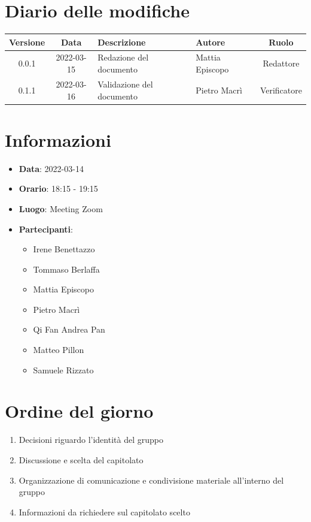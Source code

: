 \documentclass[12pt, a4paper,table]{article}
\begin{document}
	\section*{Diario delle modifiche}
	\begin{center}
	\begin{tabular}{ |c|c|m{9em}|m{5em}|c| }
	\hline
	\textbf{Versione} & \textbf{Data} & \textbf{Descrizione} &  \textbf{Autore} &  \textbf{Ruolo} \\
	\hline
	0.0.1 & 2022-03-15 & Redazione del documento & Mattia Episcopo & Redattore\\
	\hline
    0.1.1 & 2022-03-16 & Validazione del documento & Pietro Macrì & Verificatore\\
	\hline
	\end{tabular}
	\end{center}
	\newpage
	\tableofcontents
	\newpage
	\section{Informazioni}
	\begin{itemize}
		\item \textbf{Data}: 2022-03-14
		\item \textbf{Orario}: 18:15 - 19:15
		\item \textbf{Luogo}: Meeting Zoom
		\item \textbf{Partecipanti}:
		\begin{itemize}
			\item Irene Benettazzo
			\item Tommaso Berlaffa
			\item Mattia Episcopo
			\item Pietro Macrì
			\item Qi Fan Andrea Pan
			\item Matteo Pillon
			\item Samuele Rizzato
		\end{itemize}
	\end{itemize}
	\section{Ordine del giorno}
	\begin{enumerate}
		\item Decisioni riguardo l'identità del gruppo
		\item Discussione e scelta del capitolato
		\item Organizzazione di comunicazione e condivisione materiale all'interno del gruppo
		\item Informazioni da richiedere sul capitolato scelto
	\end{enumerate}
	\newpage
\end{document}
